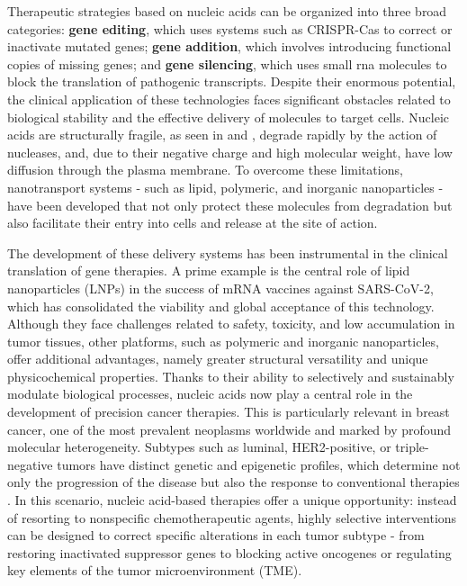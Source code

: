 Therapeutic strategies based on nucleic acids can be organized into three broad
categories: \textbf{gene editing}, which uses systems such as CRISPR-Cas to
correct or inactivate mutated genes; \textbf{gene addition}, which involves
introducing functional copies of missing genes; and \textbf{gene silencing},
which uses small \gls{rna} molecules to block the translation of pathogenic
transcripts. Despite their enormous potential, the clinical application of
these technologies faces significant obstacles related to biological stability
and the effective delivery of molecules to target cells. Nucleic acids are
structurally fragile, as seen in \textcite{_Mendes2022Nanodelivery} and
\textcite{Mendes2024Nanoparticles}, degrade rapidly by the action of nucleases,
and, due to their negative charge and high molecular weight, have low diffusion
through the plasma membrane. To overcome these limitations, nanotransport
systems - such as lipid, polymeric, and inorganic nanoparticles - have been
developed that not only protect these molecules from degradation but also
facilitate their entry into cells and release at the site of action.

The development of these delivery systems has been instrumental in the clinical
translation of gene therapies. A prime example is the central role of lipid
nanoparticles (LNPs) in the success of mRNA vaccines against SARS-CoV-2, which
has consolidated the viability and global acceptance of this technology.
Although they face challenges related to safety, toxicity, and low accumulation
in tumor tissues, other platforms, such as polymeric and inorganic
nanoparticles, offer additional advantages, namely greater structural
versatility and unique physicochemical properties. Thanks to their ability to
selectively and sustainably modulate biological processes, nucleic acids now
play a central role in the development of precision cancer therapies. This is
particularly relevant in breast cancer, one of the most prevalent neoplasms
worldwide and marked by profound molecular heterogeneity. Subtypes such as
luminal, HER2-positive, or triple-negative tumors have distinct genetic and
epigenetic profiles, which determine not only the progression of the disease
but also the response to conventional therapies
\textcite{Mendes2024Nanoparticles}. In this scenario, nucleic acid-based
therapies offer a unique opportunity: instead of resorting to nonspecific
chemotherapeutic agents, highly selective interventions can be designed to
correct specific alterations in each tumor subtype - from restoring inactivated
suppressor genes to blocking active oncogenes or regulating key elements of the
tumor microenvironment (TME).

